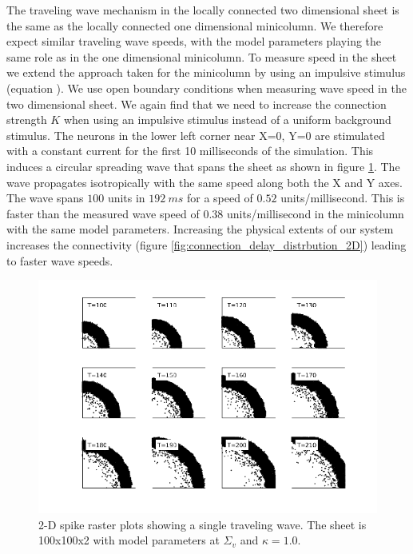 \documentclass[12pt]{article}
\begin{document}
The traveling wave mechanism in the locally connected two dimensional sheet is the same as the locally connected one dimensional minicolumn.
We therefore expect similar traveling wave speeds, with the model parameters playing the same role as in the one dimensional minicolumn.
To measure speed in the sheet we extend the approach taken for the minicolumn by using an impulsive stimulus (equation ).
We use open boundary conditions when measuring wave speed in the two dimensional sheet.
We again find that we need to increase the connection strength $K$ when using an impulsive stimulus instead of a uniform background stimulus.
The neurons in the lower left corner near X=0, Y=0 are stimulated with a constant current for the first 10 milliseconds of the simulation.
This induces a circular spreading wave that spans the sheet as shown in figure \ref{fig:2DWaveSpeedRaster}.
The wave propagates isotropically with the same speed along both the X and Y axes.
The wave spans $100$ units in $192~ms$ for a speed of $0.52$ units/millisecond.
This is faster than the measured wave speed of $0.38$ units/millisecond in the minicolumn with the same model parameters.
Increasing the physical extents of our system increases the 
connectivity (figure \ref{fig:connection_delay_distrbution_2D}) leading to faster wave speeds.
\begin{figure}[!htb]
 \caption{ 2-D spike raster plots showing a single traveling wave.
           The sheet is 100x100x2 with model parameters at $\Sigma_v$ and $\kappa=1.0$.
           }
 \label{fig:2DWaveSpeedRaster}
 \centering
   \includegraphics[width=\textwidth]{fig/2DWaveRasters_WaveSpeedExample}
\end{figure}
\FloatBarrier
\end{document}
